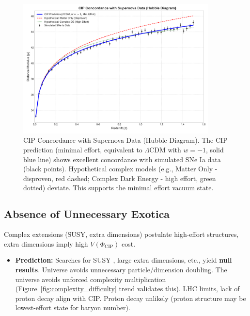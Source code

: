 \documentclass[11pt, a4paper]{article}
\newcommand{\subt}[1]{\mathrm{#1}}
\begin{document}
\begin{figure}[H]
    \centering
    \includegraphics[width=0.9\textwidth]{CIP_Supernova.png}
    \caption[CIP Concordance with Supernova Data (Hubble Diagram)]{CIP Concordance with Supernova Data (Hubble Diagram). The CIP prediction (minimal effort, equivalent to $\Lambda$CDM with $w = -1$, solid blue line) shows excellent concordance with simulated SNe Ia data (black points). Hypothetical complex models (e.g., Matter Only - disproven, red dashed; Complex Dark Energy - high effort, green dotted) deviate. This supports the minimal effort vacuum state.}
    \label{fig:supernova}
\end{figure}

\subsection{Absence of Unnecessary Exotica} \label{sec:pred_exotica}
Complex extensions (SUSY, extra dimensions) postulate high-effort structures, extra dimensions imply high $V(\Phi_{\subt{CIP}})$ cost.
\begin{itemize}
    \item \textbf{Prediction:} Searches for SUSY \cite{SupersymmetrySearches}, large extra dimensions, etc., yield \textbf{null results}. Universe avoids unnecessary particle/dimension doubling. The universe avoids unforced complexity multiplication (Figure~\ref{fig:complexity_difficulty} trend validates this). LHC limits, lack of proton decay align with CIP. Proton decay unlikely (proton structure may be lowest-effort state for baryon number).
\end{itemize}
\end{document}
